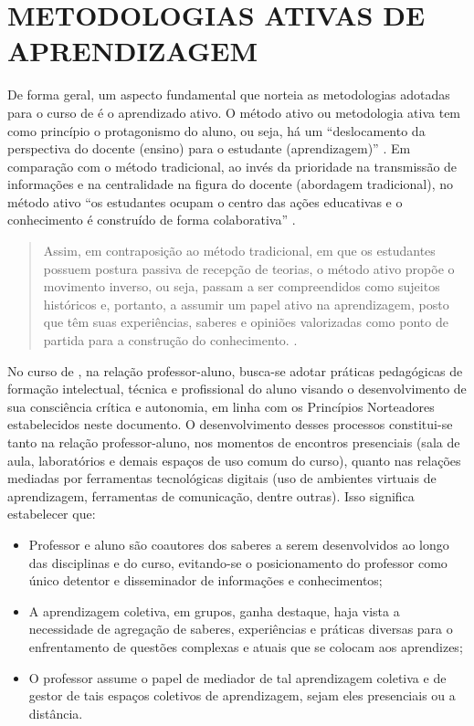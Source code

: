 \section{METODOLOGIAS ATIVAS DE APRENDIZAGEM}

De forma geral, um aspecto fundamental que norteia as metodologias adotadas para o curso de \nomedocurso é o aprendizado ativo. O método ativo ou metodologia ativa tem como princípio o protagonismo do aluno, ou seja, há um “deslocamento da perspectiva do docente (ensino) para o estudante (aprendizagem)” \cite[p. 270]{diesel2017metodologias}. Em comparação com o método tradicional, ao invés da prioridade na transmissão de informações e na centralidade na figura do docente (abordagem tradicional), no método ativo “os estudantes ocupam o centro das ações educativas e o conhecimento é construído de forma colaborativa” \cite[p. 271]{diesel2017metodologias}.

\begin{quote}
Assim, em contraposição ao método tradicional, em que os estudantes possuem postura passiva de recepção de teorias, o método ativo propõe o movimento inverso, ou seja, passam a ser compreendidos como sujeitos históricos e, portanto, a assumir um papel ativo na aprendizagem, posto que têm suas experiências, saberes e opiniões valorizadas como ponto de partida para a construção do conhecimento. \cite[p. 271]{diesel2017metodologias}.    
\end{quote}

No curso de \nomedocurso, na relação professor-aluno, busca-se adotar práticas pedagógicas de formação intelectual, técnica e profissional do aluno visando o desenvolvimento de sua consciência crítica e autonomia, em linha com os Princípios Norteadores estabelecidos neste documento. O desenvolvimento desses processos constitui-se tanto na relação professor-aluno, nos momentos de encontros presenciais (sala de aula, laboratórios e demais espaços de uso comum do curso), quanto nas relações mediadas por ferramentas tecnológicas digitais (uso de ambientes virtuais de aprendizagem, ferramentas de comunicação, dentre outras).
Isso significa estabelecer que:

\begin{itemize}
    \item Professor e aluno são coautores dos saberes a serem desenvolvidos ao longo das disciplinas e do curso, evitando-se o posicionamento do professor como único detentor e disseminador de informações e conhecimentos;

    \item A aprendizagem coletiva, em grupos, ganha destaque, haja vista a necessidade de agregação de saberes, experiências e práticas diversas para o enfrentamento de questões complexas e atuais que se colocam aos aprendizes;

    \item O professor assume o papel de mediador de tal aprendizagem coletiva e de gestor de tais espaços coletivos de aprendizagem, sejam eles presenciais ou a distância.
\end{itemize}

